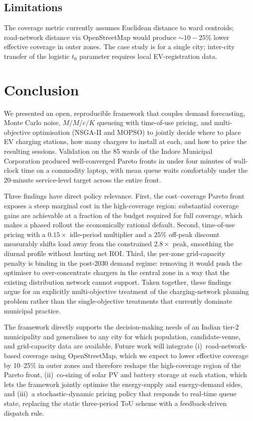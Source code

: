 \documentclass[conference]{IEEEtran}
\begin{document}
\subsection{Limitations}
The coverage metric currently assumes Euclidean distance to ward
centroids; road-network distance via OpenStreetMap would produce
$\sim10\!-\!25\%$ lower effective coverage in outer zones.
The case study is for a single city; inter-city transfer of the
logistic $t_{0}$ parameter requires local EV-registration data.

\section{Conclusion}
\label{sec:conclusion}
We presented an open, reproducible framework that couples demand
forecasting, Monte Carlo noise, $M/M/c/K$ queueing with time-of-use
pricing, and multi-objective optimisation (NSGA-II and MOPSO) to
jointly decide where to place EV charging stations, how many
chargers to install at each, and how to price the resulting
sessions. Validation on the 85 wards of the Indore Municipal
Corporation produced well-converged Pareto fronts in under four
minutes of wall-clock time on a commodity laptop, with mean queue
waits comfortably under the 20-minute service-level target across
the entire front.

Three findings have direct policy relevance. First, the
cost--coverage Pareto front exposes a steep marginal cost in the
high-coverage region: substantial coverage gains are achievable at
a fraction of the budget required for full coverage, which makes
a phased rollout the economically rational default.
Second, time-of-use pricing with a $0.15\times$ idle-period
multiplier and a $25\%$ off-peak discount measurably shifts load
away from the constrained $2.8\times$ peak, smoothing the diurnal
profile without hurting net ROI. Third, the per-zone grid-capacity
penalty is binding in the post-2030 demand regime: removing it
would push the optimiser to over-concentrate chargers in the
central zone in a way that the existing distribution network
cannot support. Taken together, these findings argue for an
explicitly multi-objective treatment of the charging-network
planning problem rather than the single-objective treatments that
currently dominate municipal practice.

The framework directly supports the decision-making needs of an
Indian tier-2 municipality and generalises to any city for which
population, candidate-venue, and grid-capacity data are available.
Future work will integrate (i)~road-network-based coverage using
OpenStreetMap, which we expect to lower effective coverage by
10--25\% in outer zones and therefore reshape the high-coverage
region of the Pareto front, (ii)~co-sizing of solar PV and battery
storage at each station, which lets the framework jointly optimise
the energy-supply and energy-demand sides, and
(iii)~a stochastic-dynamic pricing policy that responds to
real-time queue state, replacing the static three-period ToU
scheme with a feedback-driven dispatch rule.
\end{document}
